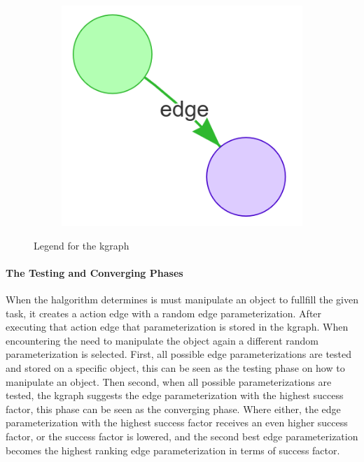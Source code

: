 \begin{figure}[H]
\begin{subfigure}{0.3\textwidth}
    \centering
    \includegraphics[width=\textwidth]{figures/proposed_method/kgraph_edge}
    \caption{}
    \end{subfigure}
    \caption{Legend for the \ac{kgraph}}%
    \label{fig:kgraph_legend}
\end{figure}

\paragraph{The Testing and Converging Phases}
When the \ac{halgorithm} determines is must manipulate an object to fullfill the given task, it creates a action edge with a random edge parameterization. After executing that action edge that parameterization is stored in the \ac{kgraph}. When encountering the need to manipulate the object again a different random parameterization is selected. First, all possible edge parameterizations are tested and stored on a specific object, this can be seen as the testing phase on how to manipulate an object. Then second, when all possible parameterizations are tested, the \ac{kgraph} suggests the edge parameterization with the highest success factor, this phase can be seen as the converging phase. Where either, the edge parameterization with the highest success factor receives an even higher success factor, or the success factor is lowered, and the second best edge parameterization becomes the highest ranking edge parameterization in terms of success factor.\bs


